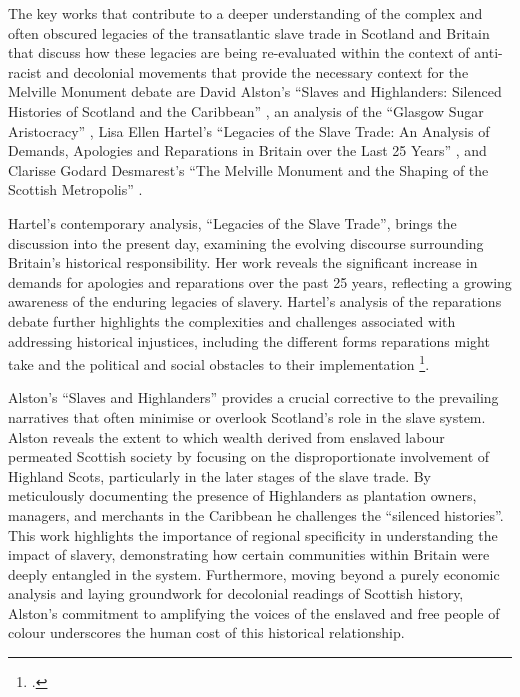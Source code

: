 \documentclass{scrartcl}
\renewcommand{\cite}{\parencite}
\begin{document}
The  key works that contribute to a deeper understanding of the complex and often obscured legacies of the transatlantic slave trade in Scotland and Britain that discuss  how these legacies are being re-evaluated within the context of anti-racist and decolonial movements that provide the necessary context for the Melville Monument debate are David Alston's ``Slaves and Highlanders: Silenced Histories of Scotland and the Caribbean'' \cite[][]{alston_2021}, an analysis of the ``Glasgow Sugar Aristocracy'' \cite[][]{mullen_2022} , Lisa Ellen Hartel's ``Legacies of the Slave Trade: An Analysis of Demands, Apologies and Reparations in Britain over the Last 25 Years'' \cite[][]{hartel_2024} , and Clarisse Godard Desmarest's ``The Melville Monument and the Shaping of the Scottish Metropolis'' \cite[][]{godard_2018}.

Hartel's contemporary analysis, ``Legacies of the Slave Trade'', brings the discussion into the present day, examining the evolving discourse surrounding Britain's historical responsibility.
Her work reveals the significant increase in demands for apologies and reparations over the past 25 years, reflecting a growing awareness of the enduring legacies of slavery.
Hartel's analysis of the reparations debate further highlights the complexities and challenges associated with addressing historical injustices, including the different forms reparations might take and the political and social obstacles to their implementation \footcite[``All three of these trends are connected to a change in narratives and the issue of apologizing becoming more important within Britain itself, helped by social media campaigns''][p.9]{hartel_2024}.

Alston's ``Slaves and Highlanders'' provides a crucial corrective to the prevailing narratives that often minimise or overlook Scotland's role in the slave system. 
Alston reveals the extent to which wealth derived from enslaved labour permeated Scottish society by focusing on the disproportionate involvement of Highland Scots, particularly in the later stages of the slave trade.
By meticulously documenting the presence of Highlanders as plantation owners, managers, and merchants in the Caribbean he challenges the ``silenced histories''.
This work highlights the importance of regional specificity in understanding the impact of slavery, demonstrating how certain communities within Britain were deeply entangled in the system.
Furthermore, moving beyond a purely economic analysis and laying groundwork for decolonial readings of Scottish history, Alston's commitment to amplifying the voices of the enslaved and free people of colour underscores the human cost of this historical relationship.
\end{document}
